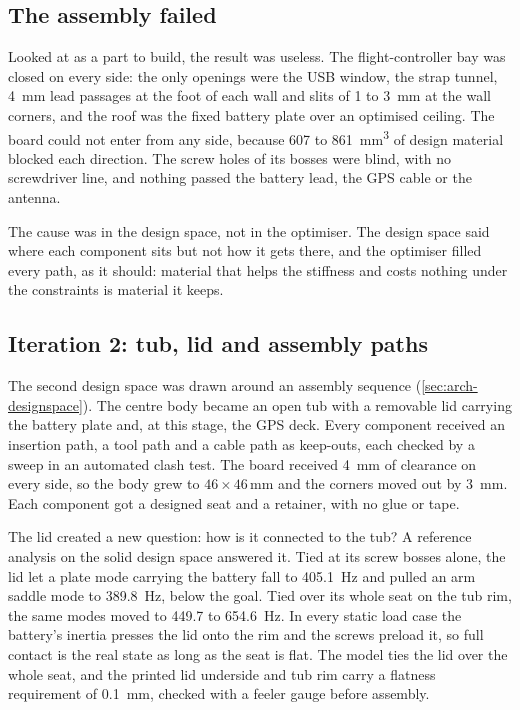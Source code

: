 \subsection{The assembly failed}

Looked at as a part to build, the result was useless. The flight-controller bay was closed on every side: the only openings were the USB window, the strap tunnel, \SI{4}{mm} lead passages at the foot of each wall and slits of 1 to \SI{3}{mm} at the wall corners, and the roof was the fixed battery plate over an optimised ceiling. The board could not enter from any side, because 607 to \SI{861}{mm^3} of design material blocked each direction. The screw holes of its bosses were blind, with no screwdriver line, and nothing passed the battery lead, the GPS cable or the antenna.

The cause was in the design space, not in the optimiser. The design space said where each component sits but not how it gets there, and the optimiser filled every path, as it should: material that helps the stiffness and costs nothing under the constraints is material it keeps.

\subsection{Iteration 2: tub, lid and assembly paths}

The second design space was drawn around an assembly sequence (\cref{sec:arch-designspace}). The centre body became an open tub with a removable lid carrying the battery plate and, at this stage, the GPS deck. Every component received an insertion path, a tool path and a cable path as keep-outs, each checked by a sweep in an automated clash test. The board received \SI{4}{mm} of clearance on every side, so the body grew to $46\times46$\,mm and the corners moved out by \SI{3}{mm}. Each component got a designed seat and a retainer, with no glue or tape.

The lid created a new question: how is it connected to the tub? A reference analysis on the solid design space answered it. Tied at its screw bosses alone, the lid let a plate mode carrying the battery fall to \SI{405.1}{Hz} and pulled an arm saddle mode to \SI{389.8}{Hz}, below the goal. Tied over its whole seat on the tub rim, the same modes moved to 449.7 to \SI{654.6}{Hz}. In every static load case the battery's inertia presses the lid onto the rim and the screws preload it, so full contact is the real state as long as the seat is flat. The model ties the lid over the whole seat, and the printed lid underside and tub rim carry a flatness requirement of \SI{0.1}{mm}, checked with a feeler gauge before assembly.

